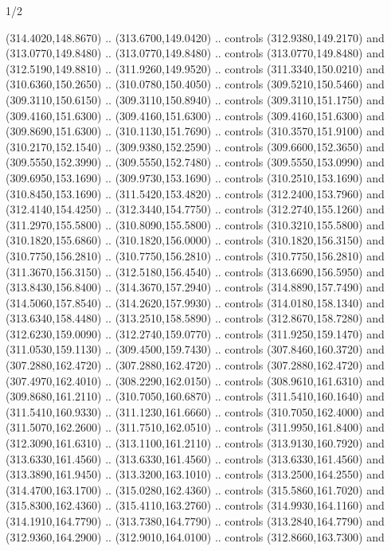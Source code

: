 \begin{flagdescription}{1/2}
\begin{scope}[xshift=0.5\flaglength]
\begin{scope}[scale=0.004\flagwidth,xshift=-90mm,yshift=89mm]
\begin{scope}[y=0.80pt, x=0.80pt, yscale=-1, xscale=1, inner sep=0pt, outer sep=0pt]
  (314.4020,148.8670) .. (313.6700,149.0420) .. controls (312.9380,149.2170) and
  (313.0770,149.8480) .. (313.0770,149.8480) .. controls (313.0770,149.8480) and
  (312.5190,149.8810) .. (311.9260,149.9520) .. controls (311.3340,150.0210) and
  (310.6360,150.2650) .. (310.0780,150.4050) .. controls (309.5210,150.5460) and
  (309.3110,150.6150) .. (309.3110,150.8940) .. controls (309.3110,151.1750) and
  (309.4160,151.6300) .. (309.4160,151.6300) .. controls (309.4160,151.6300) and
  (309.8690,151.6300) .. (310.1130,151.7690) .. controls (310.3570,151.9100) and
  (310.2170,152.1540) .. (309.9380,152.2590) .. controls (309.6600,152.3650) and
  (309.5550,152.3990) .. (309.5550,152.7480) .. controls (309.5550,153.0990) and
  (309.6950,153.1690) .. (309.9730,153.1690) .. controls (310.2510,153.1690) and
  (310.8450,153.1690) .. (311.5420,153.4820) .. controls (312.2400,153.7960) and
  (312.4140,154.4250) .. (312.3440,154.7750) .. controls (312.2740,155.1260) and
  (311.2970,155.5800) .. (310.8090,155.5800) .. controls (310.3210,155.5800) and
  (310.1820,155.6860) .. (310.1820,156.0000) .. controls (310.1820,156.3150) and
  (310.7750,156.2810) .. (310.7750,156.2810) .. controls (310.7750,156.2810) and
  (311.3670,156.3150) .. (312.5180,156.4540) .. controls (313.6690,156.5950) and
  (313.8430,156.8400) .. (314.3670,157.2940) .. controls (314.8890,157.7490) and
  (314.5060,157.8540) .. (314.2620,157.9930) .. controls (314.0180,158.1340) and
  (313.6340,158.4480) .. (313.2510,158.5890) .. controls (312.8670,158.7280) and
  (312.6230,159.0090) .. (312.2740,159.0770) .. controls (311.9250,159.1470) and
  (311.0530,159.1130) .. (309.4500,159.7430) .. controls (307.8460,160.3720) and
  (307.2880,162.4720) .. (307.2880,162.4720) .. controls (307.2880,162.4720) and
  (307.4970,162.4010) .. (308.2290,162.0150) .. controls (308.9610,161.6310) and
  (309.8680,161.2110) .. (310.7050,160.6870) .. controls (311.5410,160.1640) and
  (311.5410,160.9330) .. (311.1230,161.6660) .. controls (310.7050,162.4000) and
  (311.5070,162.2600) .. (311.7510,162.0510) .. controls (311.9950,161.8400) and
  (312.3090,161.6310) .. (313.1100,161.2110) .. controls (313.9130,160.7920) and
  (313.6330,161.4560) .. (313.6330,161.4560) .. controls (313.6330,161.4560) and
  (313.3890,161.9450) .. (313.3200,163.1010) .. controls (313.2500,164.2550) and
  (314.4700,163.1700) .. (315.0280,162.4360) .. controls (315.5860,161.7020) and
  (315.8300,162.4360) .. (315.4110,163.2760) .. controls (314.9930,164.1160) and
  (314.1910,164.7790) .. (313.7380,164.7790) .. controls (313.2840,164.7790) and
  (312.9360,164.2900) .. (312.9010,164.0100) .. controls (312.8660,163.7300) and

\end{scope}
\end{scope}
\end{scope}
\end{flagdescription}
